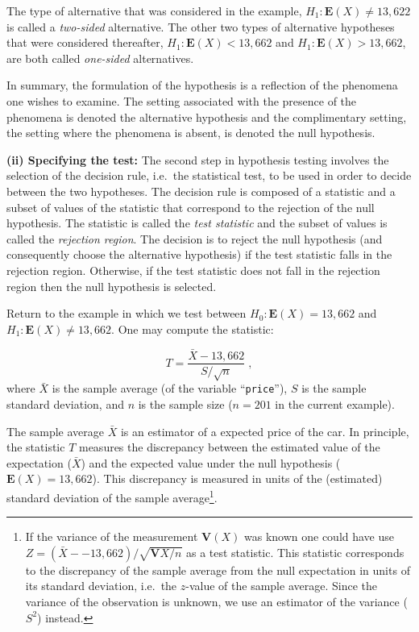 \documentclass[]{krantz}
\newcommand{\Expec}{\mathbf{E}}
\newcommand{\Var}{\mathbf{V}}
\theoremstyle{definition}
\theoremstyle{definition}
\theoremstyle{definition}
\theoremstyle{remark}
\begin{document}
The type of alternative that was considered in the example,
\(H_1: \Expec(X) \not = 13,622\) is called a \emph{two-sided} alternative. The
other two types of alternative hypotheses that were considered
thereafter, \(H_1: \Expec(X) < 13,662\) and \(H_1: \Expec(X) > 13,662\), are
both called \emph{one-sided} alternatives.

In summary, the formulation of the hypothesis is a reflection of the
phenomena one wishes to examine. The setting associated with the
presence of the phenomena is denoted the alternative hypothesis and the
complimentary setting, the setting where the phenomena is absent, is
denoted the null hypothesis.

{\textbf{(ii) Specifying the test:}} The second step in hypothesis testing
involves the selection of the decision rule, i.e.~the statistical test,
to be used in order to decide between the two hypotheses. The decision
rule is composed of a statistic and a subset of values of the statistic
that correspond to the rejection of the null hypothesis. The statistic
is called the \emph{test statistic} and the subset of values is called the
\emph{rejection region}. The decision is to reject the null hypothesis (and
consequently choose the alternative hypothesis) if the test statistic
falls in the rejection region. Otherwise, if the test statistic does not
fall in the rejection region then the null hypothesis is selected.

Return to the example in which we test between \(H_0:\Expec(X) = 13,662\)
and \(H_1:\Expec(X) \not= 13,662\). One may compute the statistic:

\[T = \frac{\bar X - 13,662}{S/\sqrt{n}}\;,\] where \(\bar X\) is the
sample average (of the variable ``\texttt{price}''), \(S\) is the sample standard
deviation, and \(n\) is the sample size (\(n = 201\) in the current
example).

The sample average \(\bar X\) is an estimator of a expected price of the
car. In principle, the statistic \(T\) measures the discrepancy between
the estimated value of the expectation (\(\bar X\)) and the expected value
under the null hypothesis (\(\Expec(X) = 13,662\)). This discrepancy is
measured in units of the (estimated) standard deviation of the sample
average\footnote{If the variance of the measurement \(\Var(X)\) was known one could
  have use \(Z = (\bar X- - 13,662)/\sqrt{\Var{X}/n}\) as a test
  statistic. This statistic corresponds to the discrepancy of the
  sample average from the null expectation in units of its standard
  deviation, i.e.~the \(z\)-value of the sample average. Since the
  variance of the observation is unknown, we use an estimator of the
  variance (\(S^2\)) instead.}.
\end{document}
